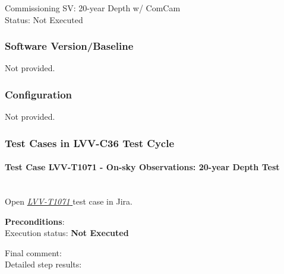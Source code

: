 \documentclass[DM,lsstdraft,STR,toc]{lsstdoc}
\begin{document}
  Commissioning SV: 20-year Depth w/ ComCam
\\
  Status: Not Executed

  

  \subsubsection{Software Version/Baseline}
    Not provided.

  \subsubsection{Configuration}
    Not provided.

  \subsubsection{Test Cases in LVV-C36 Test Cycle}


    \paragraph{Test Case LVV-T1071 - On-sky Observations: 20-year Depth Test
 }\mbox{}\\

Open  \href{https://jira.lsstcorp.org/secure/Tests.jspa#/testCase/LVV-T1071}{\textit{ LVV-T1071 } }
test case in Jira.

    

    \textbf{ Preconditions}:\\
    

    Execution status: {\bf Not Executed }

    Final comment:\\


    Detailed step results:
\end{document}
